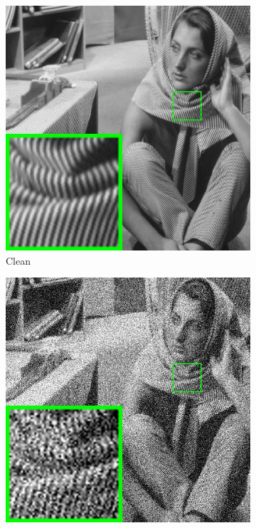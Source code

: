 \begin{figure}
    \centering
    \begin{subfigure}[t]{0.24\textwidth}
        \centering
        \includegraphics[width=1\textwidth]{images/pgpd/pgdpd/br_barbara.jpg}
	   \caption{Clean}
    \end{subfigure}
    \hfill
    \begin{subfigure}[t]{0.24\textwidth}
        \centering
        \includegraphics[width=1\textwidth]{images/pgpd/pgdpd/br_50_barbara.jpg}

\end{subfigure}
\end{figure}

